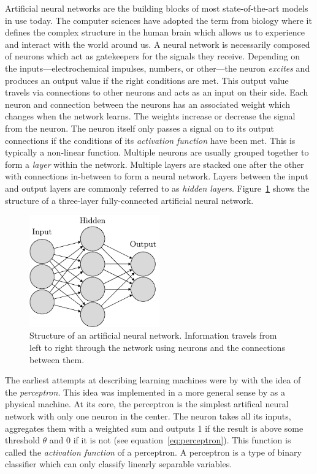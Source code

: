 \documentclass[final]{vutinfth} %
\begin{document}
Artificial neural networks are the building blocks of most
state-of-the-art models in use today. The computer sciences have
adopted the term from biology where it defines the complex structure
in the human brain which allows us to experience and interact with the
world around us. A neural network is necessarily composed of neurons
which act as gatekeepers for the signals they receive. Depending on
the inputs—electrochemical impulses, numbers, or other—the neuron
\emph{excites} and produces an output value if the right conditions
are met. This output value travels via connections to other neurons
and acts as an input on their side. Each neuron and connection between
the neurons has an associated weight which changes when the network
learns. The weights increase or decrease the signal from the
neuron. The neuron itself only passes a signal on to its output
connections if the conditions of its \emph{activation function} have
been met. This is typically a non-linear function. Multiple neurons
are usually grouped together to form a \emph{layer} within the
network. Multiple layers are stacked one after the other with
connections in-between to form a neural network. Layers between the
input and output layers are commonly referred to as \emph{hidden
layers}. Figure~\ref{fig:neural-network} shows the structure of a
three-layer fully-connected artificial neural network.

\begin{figure}
  \centering
  \includegraphics[width=0.5\textwidth]{graphics/neural-network/neural-network.pdf}
  \caption[Structure of an artificial neural network]{Structure of an
    artificial neural network. Information travels from left to right
    through the network using neurons and the connections between
    them.}
  \label{fig:neural-network}
\end{figure}

The earliest attempts at describing learning machines were by
\textcite{mcculloch1943} with the idea of the \emph{perceptron}. This
idea was implemented in a more general sense by
\textcite{rosenblatt1957,rosenblatt1962} as a physical machine. At its
core, the perceptron is the simplest artifical neural network with
only one neuron in the center. The neuron takes all its inputs,
aggregates them with a weighted sum and outputs 1 if the result is
above some threshold $\theta$ and 0 if it is not (see
equation~\ref{eq:perceptron}). This function is called the
\emph{activation function} of a perceptron. A perceptron is a type of
binary classifier which can only classify linearly separable
variables.
\end{document}
